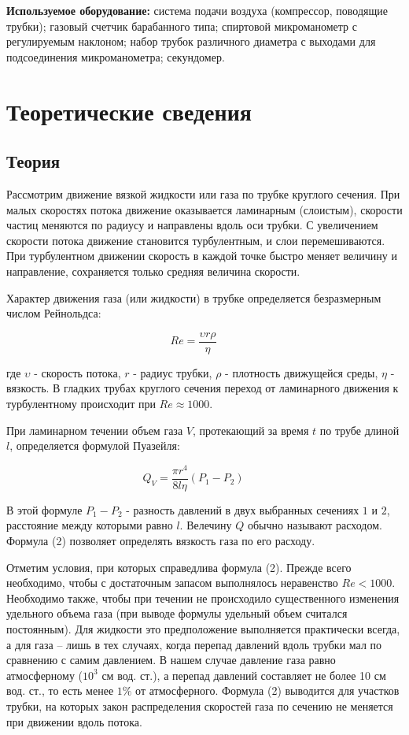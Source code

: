 \documentclass[a4paper, 12pt]{article} %
\begin{document}
\textbf{Используемое оборудование:} система подачи воздуха (компрессор, поводящие трубки); газовый счетчик барабанного типа; спиртовой микроманометр с регулируемым наклоном; набор трубок различного диаметра с выходами для подсоединения микроманометра; секундомер.

\section{Теоретические сведения}

\subsection{Теория}

Рассмотрим движение вязкой жидкости или газа по трубке круглого сечения. При малых скоростях потока движение оказывается ламинарным (слоистым), скорости частиц меняются по радиусу и направлены вдоль оси трубки. С увеличением скорости потока движение становится турбулентным, и слои перемешиваются. При турбулентном движении скорость в каждой точке быстро меняет величину и направление, сохраняется только средняя величина скорости.

Характер движения газа (или жидкости) в трубке определяется безразмерным числом Рейнольдса:

\begin{equation}
    Re = \dfrac{\upsilon r \rho}{\eta} \text{  } \text{  } \text{  }
\end{equation}

где $\upsilon$ - скорость потока, $r$ - радиус трубки, $\rho$ - плотность движущейся среды, $\eta$ - вязкость. В гладких трубах круглого сечения переход от ламинарного движения к турбулентному происходит при $Re \approx 1000$.

При ламинарном течении объем газа $V$, протекающий за время $t$ по трубе длиной $l$, определяется формулой Пуазейля:

\begin{equation}
    Q_V = \dfrac{\pi r^4}{8 l \eta}(P_1 - P_2) \text{  } \text{  } \text{  }
\end{equation}

В этой формуле $P_1 - P_2$ - разность давлений в двух выбранных сечениях $1$ и $2$, расстояние между которыми равно $l$. Велечину $Q$ обычно называют расходом. Формула (2) позволяет определять вязкость газа по его расходу.

Отметим условия, при которых справедлива формула (2). Прежде всего необходимо, чтобы с достаточным запасом выполнялось неравенство $Re < 1000$. Необходимо также, чтобы при течении не происходило существенного изменения удельного объема газа (при выводе формулы удельный объем считался постоянным). Для жидкости это предположение выполняется практически всегда, а для газа -- лишь в тех случаях, когда перепад давлений вдоль трубки мал по сравнению с самим давлением. В нашем случае давление газа равно атмосферному ($10^3$ см вод. ст.), а перепад давлений составляет не более 10 см вод. ст., то есть менее $1\%$ от атмосферного. Формула (2) выводится для участков трубки, на которых закон распределения скоростей газа по сечению не меняется при движении вдоль потока.
\end{document}
